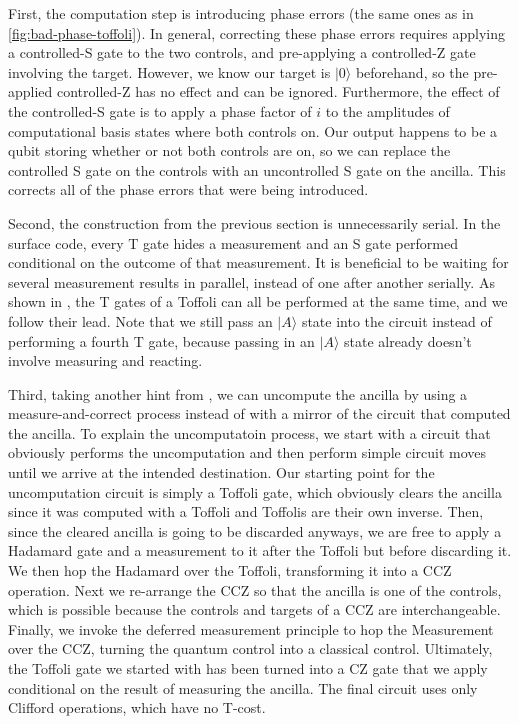\documentclass[twocolumn,longbibliography]{quantumarticle-customized}
\begin{document}
First, the computation step is introducing phase errors (the same ones as in \autoref{fig:bad-phase-toffoli}).
In general, correcting these phase errors requires applying a controlled-S gate to the two controls, and pre-applying a controlled-Z gate involving the target.
However, we know our target is $|0\rangle$ beforehand, so the pre-applied controlled-Z has no effect and can be ignored.
Furthermore, the effect of the controlled-S gate is to apply a phase factor of $i$ to the amplitudes of computational basis states where both controls on.
Our output happens to be a qubit storing whether or not both controls are on, so we can replace the controlled S gate on the controls with an uncontrolled S gate on the ancilla.
This corrects all of the phase errors that were being introduced.

Second, the construction from the previous section is unnecessarily serial.
In the surface code, every T gate hides a measurement and an S gate performed conditional on the outcome of that measurement.
It is beneficial to be waiting for several measurement results in parallel, instead of one after another serially.
As shown in \cite{Jones2013}, the T gates of a Toffoli can all be performed at the same time, and we follow their lead.
Note that we still pass an $|A\rangle$ state into the circuit instead of performing a fourth T gate, because passing in an $|A\rangle$ state already doesn't involve measuring and reacting.

Third, taking another hint from \cite{Jones2013}, we can uncompute the ancilla by using a measure-and-correct process instead of with a mirror of the circuit that computed the ancilla.
To explain the uncomputatoin process, we start with a circuit that obviously performs the uncomputation and then perform simple circuit moves until we arrive at the intended destination.
Our starting point for the uncomputation circuit is simply a Toffoli gate, which obviously clears the ancilla since it was computed with a Toffoli and Toffolis are their own inverse.
Then, since the cleared ancilla is going to be discarded anyways, we are free to apply a Hadamard gate and a measurement to it after the Toffoli but before discarding it.
We then hop the Hadamard over the Toffoli, transforming it into a CCZ operation.
Next we re-arrange the CCZ so that the ancilla is one of the controls, which is possible because the controls and targets of a CCZ are interchangeable.
Finally, we invoke the deferred measurement principle \cite{Nielsen2009} to hop the Measurement over the CCZ, turning the quantum control into a classical control.
Ultimately, the Toffoli gate we started with has been turned into a CZ gate that we apply conditional on the result of measuring the ancilla.
The final circuit uses only Clifford operations, which have no T-cost.
\end{document}

